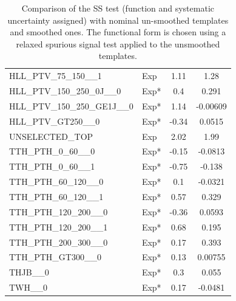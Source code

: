 \begin{table}[!h]
{\begin{tabular}{llcc}
			HLL\_PTV\_75\_150\_\_1                                      & Exp &1.11&1.28\\
			HLL\_PTV\_150\_250\_0J\_\_0                                 & Exp* &0.4&0.291\\
			HLL\_PTV\_150\_250\_GE1J\_\_0                               & Exp* &1.14&-0.00609\\
			HLL\_PTV\_GT250\_\_0                                        & Exp* &-0.34&0.0515\\
			UNSELECTED\_TOP                                             & Exp &2.02&1.99\\
			TTH\_PTH\_0\_60\_\_0                                        & Exp* &-0.15&-0.0813\\
			TTH\_PTH\_0\_60\_\_1                                        & Exp* &-0.75&-0.138\\
			TTH\_PTH\_60\_120\_\_0                                      & Exp* &0.1&-0.0321\\
			TTH\_PTH\_60\_120\_\_1                                      & Exp* &0.57&0.329\\
			TTH\_PTH\_120\_200\_\_0                                     & Exp* &-0.36&0.0593\\
			TTH\_PTH\_120\_200\_\_1                                     & Exp* &0.68&0.195\\
			TTH\_PTH\_200\_300\_\_0                                     & Exp* &0.17&0.393\\
			TTH\_PTH\_GT300\_\_0                                        & Exp* &0.13&0.00755\\
			THJB\_\_0                                                   & Exp* &0.3&0.055\\
			TWH\_\_0                                                    & Exp* &0.17&-0.0481\\
			\hline\hline		
		\end{tabular}
	}
	\caption{
		Comparison of the SS test (function and systematic uncertainty assigned) with nominal un-smoothed templates and smoothed ones. The functional form is chosen using a relaxed spurious signal test applied to the unsmoothed templates.
		\label{tab:comp_smooth_unsmooth2}   }   
\end{table}


